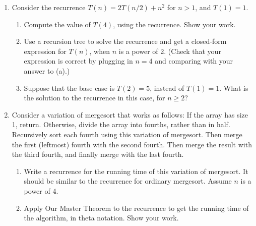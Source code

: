 \documentclass{article}
\begin{document}
\begin{enumerate}
    \item Consider the recurrence $T(n) = 2T(n/2) + n^2$ for $n > 1$, and $T(1) = 1$.
    \begin{enumerate}
        \item Compute the value of $T(4)$, using the recurrence. Show your work.
        \item Use a recursion tree to solve the recurrence and get a closed-form expression for $T(n)$, when $n$ is a power of 2. (Check that your expression is correct by plugging in $n = 4$ and comparing with your answer to (a).)
        \item Suppose that the base case is $T(2) = 5$, instead of $T(1) = 1$. What is the solution to the recurrence in this case, for $n \ge 2$?
    \end{enumerate}

    \item Consider a variation of mergesort that works as follows: If the array has size 1, return. Otherwise, divide the array into fourths, rather than in half. Recursively sort each fourth using this variation of mergesort. Then merge the first (leftmost) fourth with the second fourth. Then merge the result with the third fourth, and finally merge with the last fourth.
    \begin{enumerate}
        \item Write a recurrence for the running time of this variation of mergesort. It should be similar to the recurrence for ordinary mergesort. Assume $n$ is a power of 4.
        \item Apply Our Master Theorem to the recurrence to get the running time of the algorithm, in theta notation. Show your work.
    \end{enumerate}


\end{enumerate}
\end{document}
